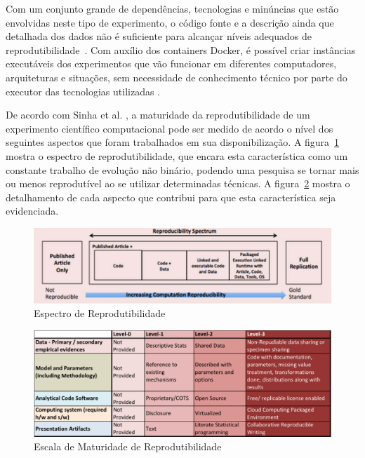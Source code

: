 \documentclass[12pt,openany,oneside,a4paper,english,brazil]{abntbibufjf}
\begin{document}
    Com um conjunto grande de dependências, tecnologias e minúncias que estão envolvidas neste tipo de experimento, o código fonte e a descrição ainda que detalhada dos dados não é suficiente para alcançar níveis adequados de reprodutibilidade~\cite{ince2012}. Com auxílio dos containers Docker, é possível criar instâncias executáveis dos experimentos que vão funcionar em diferentes computadores, arquiteturas e situações, sem necessidade de conhecimento técnico por parte do executor das tecnologias utilizadas \cite{boettiger2015}.

    De acordo com Sinha et al. \cite{sinha2016}, a maturidade da reprodutibilidade de um experimento científico computacional pode ser medido de acordo o nível dos seguintes aspectos que foram trabalhados em sua disponibilização. A figura~\ref{fig:espectro_reprodutibilidade} mostra o espectro de reprodutibilidade, que encara esta característica como um constante trabalho de evolução não binário, podendo uma pesquisa se tornar mais ou menos reprodutível ao se utilizar determinadas técnicas. A figura~\ref{fig:escala_reprodutibilidade} mostra o detalhamento de cada aspecto que contribui para que esta característica seja evidenciada.

    \begin{figure}[!htbp]
     \includegraphics[width=\textwidth]{espectro_reprodutibilidade}
     \caption{Espectro de Reprodutibilidade}\label{fig:espectro_reprodutibilidade}
    \end{figure}

    \begin{figure}[!htbp]
     \includegraphics[width=\textwidth]{escala_reprodutibilidade}
     \caption{Escala de Maturidade de Reprodutibilidade}\label{fig:escala_reprodutibilidade}
    \end{figure}
\end{document}
